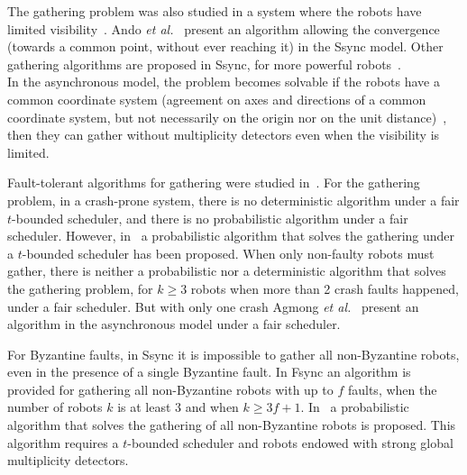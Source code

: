 The gathering problem was also studied in a system where the robots have limited visibility~\cite{FPS12}.
Ando \textit{et al.}~\cite{AndoOSY99} present an algorithm allowing the convergence (towards a common point, without ever reaching it) in the Ssync model. Other gathering algorithms are proposed in Ssync, for more powerful robots~\cite{SouissiDY09}.\\
In the asynchronous model, the problem becomes solvable if the robots have a common coordinate system (agreement on axes and directions of a common coordinate system, but not necessarily on the origin nor on the unit distance)~\cite{FPSW05j}, then they can gather without multiplicity detectors even when the visibility is limited. %

Fault-tolerant algorithms for gathering were studied in~\cite{AgmonP06,DefagoGMP06}.
For the gathering problem, in a crash-prone system, there is no deterministic algorithm under a fair $t$-bounded scheduler, and there is no probabilistic algorithm under a fair scheduler.
However, in~\cite{DefagoGMP06} a probabilistic algorithm that solves the gathering under a $t$-bounded scheduler has been proposed. 
When only non-faulty robots must gather, there is neither a probabilistic nor a deterministic algorithm that solves the gathering problem, for $k\geq3$ robots when more than 2 crash faults happened, under a fair scheduler. But with only one crash Agmong \textit{et al.}~\cite{AgmonP06} present an algorithm in the asynchronous model under a fair scheduler. %

 For Byzantine faults, in Ssync it is impossible to gather all non-Byzantine robots, even in the presence of a single Byzantine fault. In Fsync an algorithm is provided for gathering all non-Byzantine robots with up to $f$ faults, when the number of robots $k$ is at least $3$ and when $k \geq 3f + 1$.
 In~\cite{DefagoGMP06}  a probabilistic algorithm that solves the gathering of all non-Byzantine robots is proposed. This algorithm requires a $t$-bounded scheduler and robots endowed with strong global multiplicity detectors.



